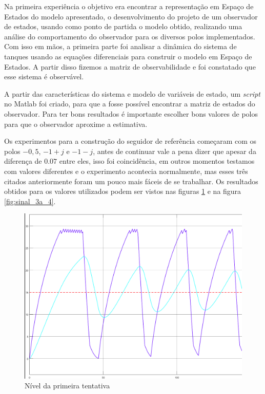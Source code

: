 \documentclass[
	12pt,				%
	openany,			%
	oneside,			%
	a4paper,			%
	english,			%
	french,				%
	spanish,			%
	brazil,				%
	]{abntex2}
\begin{document}
{Na primeira experiência o objetivo era encontrar a representação em Espaço de Estados do modelo apresentado, o desenvolvimento do projeto de um observador de estados, usando como ponto de partida o modelo obtido, realizando uma análise do comportamento do observador para os diversos polos implementados. Com isso em mãos, a primeira parte foi analisar a dinâmica do sistema de tanques usando as equações diferenciais para construir o modelo em Espaço de Estados. A partir disso fizemos a matriz de observabilidade e foi constatado que esse sistema é observável.

A partir das características do sistema e modelo de variáveis de estado, um \textit{script} no Matlab foi criado, para que a fosse possível encontrar a matriz de estados do observador. Para ter bons resultados é importante escolher bons valores de polos para que o observador aproxime a estimativa.

Os experimentos para a construção do seguidor de referência começaram com os polos $-0,5$, $-1 + j$ e $-1 - j$, antes de continuar vale a pena dizer que apesar da diferença de $0.07$ entre eles, isso foi coincidência, em outros momentos testamos com valores diferentes e o experimento acontecia normalmente, mas esses três citados anteriormente foram um pouco mais fáceis de se trabalhar. Os resultados obtidos para os valores utilizados podem ser vistos nas figuras \ref{fig:nivel_3a_4} e na figura \ref{fig:sinal_3a_4}.

\begin{figure}[h]
	\centering
	\includegraphics[scale=0.20]{imagens/niveis_3a_4.png}
	\caption{Nível da primeira tentativa}
   \label{fig:nivel_3a_4}
\end{figure}

}
\end{document}
